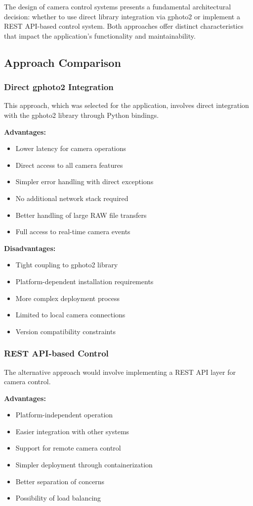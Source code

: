 The design of camera control systems presents a fundamental architectural decision: whether to use direct library integration via gphoto2 or implement a REST API-based control system. Both approaches offer distinct characteristics that impact the application's functionality and maintainability.

\subsection{Approach Comparison}

\subsubsection{Direct gphoto2 Integration}
This approach, which was selected for the application, involves direct integration with the gphoto2 library through Python bindings.

\textbf{Advantages:}
\begin{itemize}
    \item Lower latency for camera operations
    \item Direct access to all camera features
    \item Simpler error handling with direct exceptions
    \item No additional network stack required
    \item Better handling of large RAW file transfers
    \item Full access to real-time camera events
\end{itemize}

\textbf{Disadvantages:}
\begin{itemize}
    \item Tight coupling to gphoto2 library
    \item Platform-dependent installation requirements
    \item More complex deployment process
    \item Limited to local camera connections
    \item Version compatibility constraints
\end{itemize}

\subsubsection{REST API-based Control}
The alternative approach would involve implementing a REST API layer for camera control.

\textbf{Advantages:}
\begin{itemize}
    \item Platform-independent operation
    \item Easier integration with other systems
    \item Support for remote camera control
    \item Simpler deployment through containerization
    \item Better separation of concerns
    \item Possibility of load balancing
\end{itemize}

